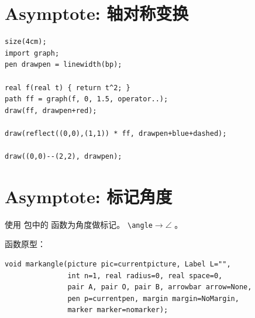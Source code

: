 \documentclass[a4paper,11pt]{article}
\begin{document}
\section{Asymptote: 轴对称变换}
\begin{Verbatim}
size(4cm);
import graph;
pen drawpen = linewidth(bp);

real f(real t) { return t^2; }
path ff = graph(f, 0, 1.5, operator..);
draw(ff, drawpen+red);

draw(reflect((0,0),(1,1)) * ff, drawpen+blue+dashed);

draw((0,0)--(2,2), drawpen);
\end{Verbatim}

\section{Asymptote: 标记角度}
使用  包中的  函数为角度做标记。
\verb+\angle+$\to \angle$ 。

\vspace{4mm}
函数原型：
\begin{Verbatim}
void markangle(picture pic=currentpicture, Label L="",
               int n=1, real radius=0, real space=0,
               pair A, pair O, pair B, arrowbar arrow=None,
               pen p=currentpen, margin margin=NoMargin,
               marker marker=nomarker);
\end{Verbatim}
\end{document}
